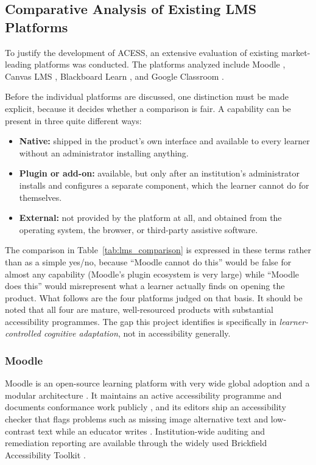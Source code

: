 \documentclass[12pt, oneside]{article} %
\begin{document}
\subsection{Comparative Analysis of Existing LMS Platforms}

To justify the development of ACESS, an extensive evaluation of existing market-leading platforms was conducted. The platforms analyzed include Moodle \cite{moodle_software}, Canvas LMS \cite{canvas_lms}, Blackboard Learn \cite{blackboard_learn}, and Google Classroom \cite{google_classroom}. 

Before the individual platforms are discussed, one distinction must be made explicit, because it decides whether a comparison is fair. A capability can be present in three quite different ways:

\begin{itemize}
    \item \textbf{Native:} shipped in the product's own interface and available to every learner without an administrator installing anything.
    \item \textbf{Plugin or add-on:} available, but only after an institution's administrator installs and configures a separate component, which the learner cannot do for themselves.
    \item \textbf{External:} not provided by the platform at all, and obtained from the operating system, the browser, or third-party assistive software.
\end{itemize}

The comparison in Table~\ref{tab:lms_comparison} is expressed in these terms rather than as a simple yes/no, because ``Moodle cannot do this'' would be false for almost any capability (Moodle's plugin ecosystem is very large) while ``Moodle does this'' would misrepresent what a learner actually finds on opening the product. What follows are the four platforms judged on that basis. It should be noted that all four are mature, well-resourced products with substantial accessibility programmes. The gap this project identifies is specifically in \emph{learner-controlled cognitive adaptation}, not in accessibility generally.

\subsubsection{Moodle}
Moodle is an open-source learning platform with very wide global adoption and a modular architecture \cite{moodle_architecture}. It maintains an active accessibility programme and documents conformance work publicly \cite{moodle_accessibility}, and its editors ship an accessibility checker that flags problems such as missing image alternative text and low-contrast text while an educator writes \cite{moodle_atto_a11y}. Institution-wide auditing and remediation reporting are available through the widely used Brickfield Accessibility Toolkit \cite{moodle_accessibility_toolkit}.
\end{document}
